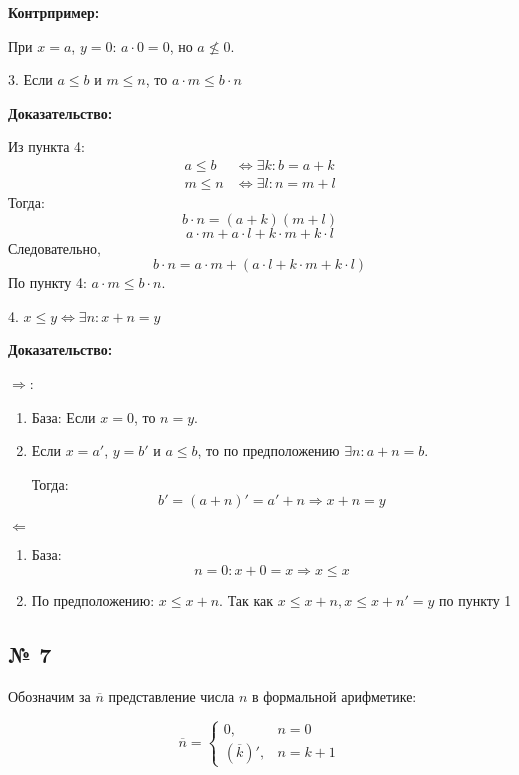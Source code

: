 \textbf{Контрпример:}

При \( x = a \), \( y = 0 \):  
\( a \cdot 0 = 0 \), но \( a \nleq 0 \).



 3. Если \( a \le b \) и \( m \le n \), то \( a \cdot m \le b \cdot n \)

\textbf{Доказательство:}

Из пункта 4:  
\[
\begin{aligned}
a \le b &\Leftrightarrow \exists k : b = a + k \\
m \le n &\Leftrightarrow \exists l : n = m + l
\end{aligned}
\]  
Тогда:  
\[
b \cdot n = (a + k)(m + l) \]
\[ a \cdot m + a \cdot l + k \cdot m + k \cdot l
\]  
Следовательно,  
\[
b \cdot n = a \cdot m + (a \cdot l + k \cdot m + k \cdot l)
\]  
По пункту 4: \( a \cdot m \le b \cdot n \).

4. \( x \le y \iff \exists n : x + n = y \)

\textbf{Доказательство:}

\( \Rightarrow \):  
  \begin{enumerate}
      \item База: Если \( x = 0 \), то \( n = y \). 
      \item Если \( x = a' \), \( y = b' \) и \( a \le b \), то по предположению \( \exists n : a + n = b \). 
    
    Тогда:  
    \[
    b' = (a + n)' = a' + n \Rightarrow x + n = y
    \]  
  \end{enumerate}


\( \Leftarrow \)
\begin{enumerate}
    \item База: $$n = 0 :  x + 0 = x \Rightarrow x \le x $$
    \item По предположению: \( x \le x + n \).  
    Так как \(x \leq  x + n, x\le x + n' = y \) по пункту 1
 
\end{enumerate}


\newpage
\subsection{№ 7}

Обозначим за $\overline{n}$ представление числа $n$ в формальной арифметике: %

$$\overline{n} = \left\{\begin{array}{ll}0, &n = 0\\
           \left(\overline{k}\right)', & n=k+1\end{array}\right.$$

